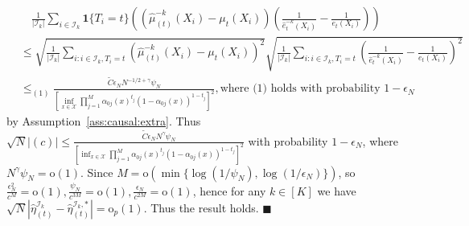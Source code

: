 \documentclass[11pt]{article}
\newcommand{\proofend}{\hfill$\blacksquare$}
\begin{document}
$$\begin{array}{rl}
&\displaystyle\quad\frac{1}{|\mathcal{I}_k|}\sum_{i\in\mathcal{I}_k}\mathbf{1}\{T_i=t\}\left(\left(\hat{\mu}_{(t)}^{-k}(X_i)-\mu_t(X_i)\right)\left(\frac{1}{\hat{e}_t^{-k}(X_i)}-\frac{1}{e_t(X_i)}\right)\right)\\
&\displaystyle\leq\sqrt{\frac{1}{|\mathcal{I}_k|}\sum_{i:i\in\mathcal{I}_k,T_i=t}\left(\hat{\mu}_{(t)}^{-k}(X_i)-\mu_t(X_i)\right)^2}\sqrt{\frac{1}{|\mathcal{I}_k|}\sum_{i:i\in\mathcal{I}_k,T_i=t}\left(\frac{1}{\hat{e}_t^{-k}(X_i)}-\frac{1}{e_t(X_i)}\right)^2}\\
&\displaystyle\leq_{(1)} \frac{\tilde{C}\epsilon_NN^{-1/2+\gamma}\psi_N}{[\inf_{x\in\mathcal{X}}\prod_{j=1}^M \alpha_{0j}(x)^{t_j}(1-\alpha_{0j}(x))^{1-t_j}]^{2}},\mbox{where (1) holds with probability $1-\epsilon_N$}
\end{array}$$
by Assumption~\ref{ass:causal:extra}. Thus $\sqrt{N}|(c)|\leq\frac{\tilde{C}\epsilon_NN^{\gamma}\psi_N}{[\inf_{x\in\mathcal{X}}\prod_{j=1}^M \alpha_{0j}(x)^{t_j}(1-\alpha_{0j}(x))^{1-t_j}]^2}$ with probability $1-\epsilon_N$, where $N^{\gamma}\psi_N=\mathrm{o}(1)$. Since $M=\mathrm{o}(\min\{\log(1/\psi_N),\log(1/\epsilon_N)\})$, so $\frac{\epsilon_N^2}{c^M}=\mathrm{o}(1), \frac{\psi_N}{c^{3M}}=\mathrm{o}(1), \frac{\epsilon_N}{c^{2M}}=\mathrm{o}(1)$, hence for any $k\in[K]$ we have $\sqrt{N}\left|\hat{\eta}_{(t)}^{\mathcal{I}_k}-\hat{\eta}_{(t)}^{\mathcal{I}_k,*}\right|=\mathrm{o}_p(1)$. Thus the result holds. 
\proofend
\end{document}
